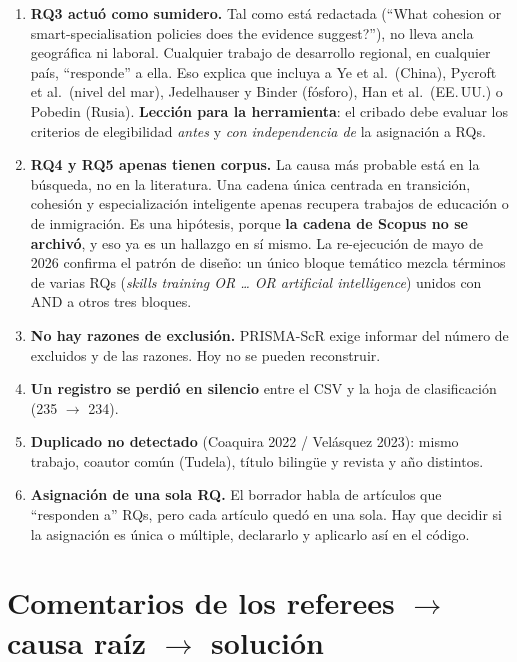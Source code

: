 \documentclass[11pt,a4paper]{article}
\begin{document}
\begin{enumerate}
  \item \textbf{RQ3 actuó como sumidero.} Tal como está redactada (``What cohesion or smart-specialisation policies does the evidence suggest?''), no lleva ancla geográfica ni laboral. Cualquier trabajo de desarrollo regional, en cualquier país, ``responde'' a ella. Eso explica que incluya a Ye et al.\ (China), Pycroft et al.\ (nivel del mar), Jedelhauser y Binder (fósforo), Han et al.\ (EE.\,UU.) o Pobedin (Rusia). \textbf{Lección para la herramienta}: el cribado debe evaluar los criterios de elegibilidad \emph{antes} y \emph{con independencia de} la asignación a RQs.
  \item \textbf{RQ4 y RQ5 apenas tienen corpus.} La causa más probable está en la búsqueda, no en la literatura. Una cadena única centrada en transición, cohesión y especialización inteligente apenas recupera trabajos de educación o de inmigración. Es una hipótesis, porque \textbf{la cadena de Scopus no se archivó}, y eso ya es un hallazgo en sí mismo. La re-ejecución de mayo de 2026 confirma el patrón de diseño: un único bloque temático mezcla términos de varias RQs (\emph{skills training OR \dots{} OR artificial intelligence}) unidos con AND a otros tres bloques.
  \item \textbf{No hay razones de exclusión.} PRISMA-ScR exige informar del número de excluidos y de las razones. Hoy no se pueden reconstruir.
  \item \textbf{Un registro se perdió en silencio} entre el CSV y la hoja de clasificación (235 $\to$ 234).
  \item \textbf{Duplicado no detectado} (Coaquira 2022 / Velásquez 2023): mismo trabajo, coautor común (Tudela), título bilingüe y revista y año distintos.
  \item \textbf{Asignación de una sola RQ.} El borrador habla de artículos que ``responden a'' RQs, pero cada artículo quedó en una sola. Hay que decidir si la asignación es única o múltiple, declararlo y aplicarlo así en el código.
\end{enumerate}

\section{Comentarios de los referees $\to$ causa raíz $\to$ solución}\label{sec:referees}
\end{document}
